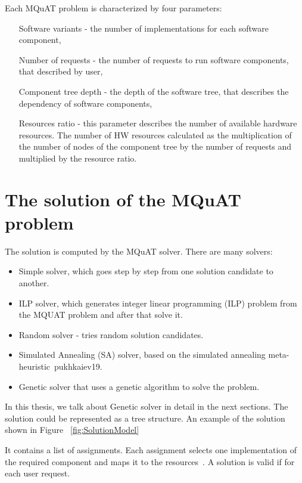 Each MQuAT problem is characterized by four parameters:

\begin{itemize}
	\item[Software variants] - the number of implementations for each software component,
	\item[Number of requests] - the number of requests to run software components, that described by user, 
	\item[Component tree depth] - the depth of the software tree, that describes the dependency of software components,
	\item[Resources ratio] - this parameter describes the number of available hardware resources. The number of HW resources calculated as the multiplication of the number of nodes of the component tree by the number of requests and multiplied by the resource ratio.
\end{itemize}

\section{The solution of the MQuAT problem}

The solution is computed by the MQuAT solver. There are many solvers:

\begin{itemize}
	\item Simple solver, which goes step by step from one solution candidate to another.
	\item ILP solver, which generates integer linear programming (ILP) problem from the MQUAT problem and after that solve it.
	\item Random solver - tries random solution candidates.
	\item Simulated Annealing (SA) solver, based on the simulated annealing meta-heuristic~{pukhkaiev19}.
	\item Genetic solver that uses a genetic algorithm to solve the problem.
\end{itemize}

In this thesis, we talk about Genetic solver in detail in the next sections.
The solution could be represented as a tree structure. An example of the solution shown in Figure ~\ref{fig:SolutionModel}

It contains a list of assignments. Each assignment selects one implementation of the required component and maps it to the resources~\cite{gotz18}.
A solution is valid if for each user request.

